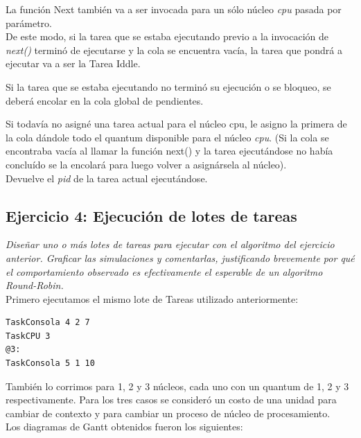 \documentclass[a4paper]{article}
\begin{document}
La funci\'on Next tambi\'en va a ser invocada para un s\'olo n\'ucleo \emph{cpu} pasada por par\'ametro.\\

De este modo, si la tarea que se estaba ejecutando previo a la invocaci\'on de \emph{next()} termin\'o de ejecutarse y la cola se encuentra vac\'ia, la tarea que pondr\'a a ejecutar va a ser la Tarea Iddle.

Si la tarea que se estaba ejecutando no termin\'o su ejecuci\'on o se bloqueo, se deber\'a encolar en la cola global de pendientes.

Si todav\'ia no asign\'e una tarea actual para el n\'ucleo cpu, le asigno la primera de la cola d\'andole todo el quantum disponible para el n\'ucleo \emph{cpu}. (Si la cola se encontraba vac\'ia al llamar la funci\'on next() y la tarea ejecut\'andose no hab\'ia conclu\'ido se la encolar\'a para luego volver a asign\'arsela al n\'ucleo).\\

Devuelve el \emph{pid} de la tarea actual ejecut\'andose.
 
\bigskip 
 
 
 \subsection{Ejercicio 4: Ejecuci\'on de lotes de tareas}
 
\textit{Dise\~nar uno o m\'as lotes de tareas para ejecutar con el algoritmo del ejercicio anterior. Graficar las simulaciones y comentarlas, justificando brevemente por qu\'e el comportamiento observado es efectivamente el esperable de un algoritmo Round-Robin.}\\


Primero ejecutamos el mismo lote de Tareas utilizado anteriormente:
	\begin{codesnippet}
	\begin{verbatim}
TaskConsola 4 2 7
TaskCPU 3
@3:
TaskConsola 5 1 10
	\end{verbatim}
	\end{codesnippet}

	Tambi\'en lo corrimos para 1, 2 y 3 n\'ucleos, cada uno con un quantum de 1, 2 y 3 respectivamente. Para los tres casos se consider\'o un costo de una unidad para cambiar de contexto y para cambiar un proceso de n\'ucleo de procesamiento.\\

Los diagramas de Gantt obtenidos fueron los siguientes:\\
\end{document}
